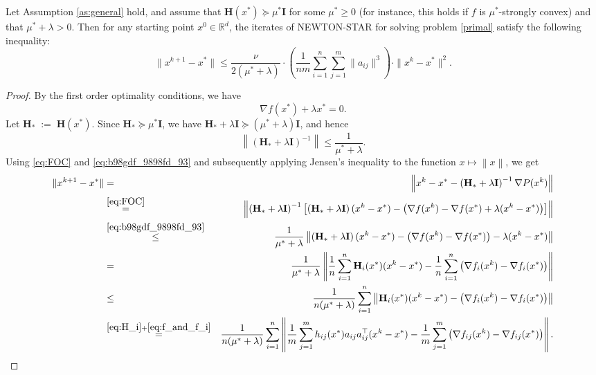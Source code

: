 \documentclass[10pt]{article}
\newcommand{\squeeze}{}
\newcommand{\eqdef}{\; { := }\;}
\newcommand{\R}{\mathbb{R}}
\newcommand{\norm}[1]{\left\|#1\right\|}
\newcommand{\newalpha}{h}
\newcommand{\mH}{\mathbf{H}}
\newcommand{\mI}{\mathbf{I}}
\begin{document}
\begin{theorem}\label{th:localquadratic}
Let  Assumption \ref{as:general} hold,  and assume that $\mH(x^*) \succeq \mu^* \mI$ for some $\mu^* \geq 0$ (for instance, this holds if $f$ is $\mu^*$-strongly convex) and that $\mu^*+\lambda >0$. Then for any starting point $x^0 \in \R^d$, the iterates of {\sf NEWTON-STAR} for solving problem \eqref{primal}   satisfy the following inequality:
\begin{equation}
\label{eq:NS-rate}
 \squeeze
 \|x^{k+1} - x^*\| \leq \frac{\nu }{2(\mu^*+\lambda)} \cdot \left( \frac{1}{nm} \sum \limits_{i=1}^n \sum \limits_{j=1}^{m} \|a_{ij}\|^3 \right) \cdot \|x^k-x^*\|^2. 
\end{equation}
\end{theorem}
\begin{proof}
{\footnotesize
By the first order optimality conditions, we have 
\begin{equation}\nabla f(x^*) + \lambda x^* = 0.\label{eq:FOC}\end{equation}
Let $\mH_* \eqdef \mH(x^*)$. Since $\mH_* \succeq \mu^* \mI$, we have $\mH_* +\lambda \mI \succeq (\mu^* +\lambda) \mI$, and hence \begin{equation}\label{eq:b98gdf_9898fd_93} \norm{\left(\mH_* + \lambda \mI\right)^{-1} } \leq \frac{1}{\mu^*+\lambda}.\end{equation} 
Using \eqref{eq:FOC} and \eqref{eq:b98gdf_9898fd_93}  and subsequently applying Jensen's inequality  to the function $x\mapsto \norm{x}$, we get 
\begin{eqnarray}
	\|x^{k+1} - x^*\| &=& \left \| x^k - x^*  - \left(\mH_* +\lambda \mI \right)^{-1} \nabla P(x^k)  \right \|  \notag \\
	&\overset{\eqref{eq:FOC}}{=}& \left \| \left(\mH_* +\lambda \mI \right)^{-1} \left[ \left(\mH_* + \lambda \mI \right)(x^k - x^*) - \left(\nabla f(x^k) -\nabla f(x^*)+ \lambda (x^k-x^*)\right)   \right] \right \|  \notag \\ 
	&\overset{\eqref{eq:b98gdf_9898fd_93}}{\leq} &\frac{1}{\mu^*+\lambda} \left \|  \left(\mH_* + \lambda \mI \right) (x^k - x^*) - \left( \nabla f(x^k) - \nabla f(x^*)   \right) - \lambda (x^k -x^*) \right \|  \notag \\ 
	&= &\frac{1}{\mu^*+\lambda} \left \|  \frac{1}{n} \sum_{i=1}^{n}  \mH_i(x^*) (x^k - x^*) -  \frac{1}{n}\sum_{i=1}^n \left( \nabla f_i(x^k) - \nabla f_i(x^*)   \right) \right \|  \notag \\ 
	&\leq & \frac{1}{n (\mu^*+\lambda)} \sum_{i=1}^{n}  \left \|  \mH_i(x^*) (x^k - x^*) -  \left( \nabla f_i(x^k) - \nabla f_i(x^*)   \right) \right \|  \notag \\ 	
	&\overset{\eqref{eq:H_i}+\eqref{eq:f_and_f_i} }{=} &\frac{1}{n (\mu^*+\lambda)} \sum_{i=1}^{n}  \left \| \frac{1}{m} \sum_{j=1}^m \newalpha_{ij}(x^*) a_{ij} a_{ij}^\top (x^k - x^*) -  \frac{1}{m} \sum_{j=1}^m \left( \nabla f_{ij}(x^k) - \nabla f_{ij}(x^*)   \right) \right \|  . \label{eq:rand-opur-9}
	\end{eqnarray}
	
}
\end{proof}
\end{document}
